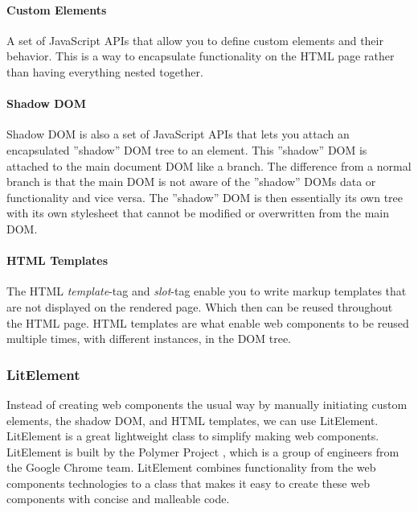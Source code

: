 \paragraph{Custom Elements}
A set of JavaScript APIs that allow you to define custom elements and their behavior. This is a way to encapsulate functionality on the HTML page rather than having everything nested together.

\paragraph{Shadow DOM}%
\label{ssub:Shadow DOM}
Shadow DOM is also a set of JavaScript APIs that lets you attach an encapsulated ''shadow'' DOM tree to an element. This ''shadow'' DOM is attached to the main document DOM like a branch. The difference from a normal branch is that the main DOM is not aware of the ''shadow'' DOMs data or functionality and vice versa. The ''shadow'' DOM is then essentially its own tree with its own stylesheet that cannot be modified or overwritten from the main DOM.\\

\paragraph{HTML Templates}%
\label{ssub:HMTL Templates}
The HTML \textit{template}-tag and \textit{slot}-tag enable you to write markup templates that are not displayed on the rendered page. Which then can be reused throughout the HTML page. HTML templates are what enable web components to be reused multiple times, with different instances, in the DOM tree.

\subsubsection{LitElement}%
\label{ssub:LitElement}
Instead of creating web components the usual way by manually initiating custom elements, the shadow DOM, and HTML templates, we can use LitElement.
LitElement is a great lightweight class to simplify making web components\cite{polymerLitElement}. LitElement is built by the Polymer Project \cite{polymerPolymerProject}, which is a group of engineers from the Google Chrome team. LitElement combines functionality from the web components technologies to a class that makes it easy to create these web components with concise and malleable code.







